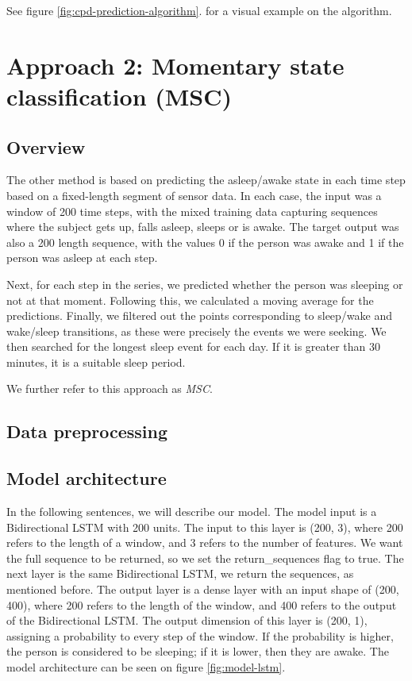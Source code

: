 \documentclass{article}
\begin{document}
See figure \ref{fig:cpd-prediction-algorithm}. for a visual example on the algorithm.

\section{Approach 2: Momentary state classification (MSC)}

\subsection{Overview}

The other method is based on predicting the asleep/awake state in each time step based on a fixed-length segment of sensor data. In each case, the input was a window of 200 time steps, with the mixed training data capturing sequences where the subject gets up, falls asleep, sleeps or is awake. The target output was also a 200 length sequence, with the values 0 if the person was awake and 1 if the person was asleep at each step.

Next, for each step in the series, we predicted whether the person was sleeping or not at that moment. Following this, we calculated a moving average for the predictions. Finally, we filtered out the points corresponding to sleep/wake and wake/sleep transitions, as these were precisely the events we were seeking. We then searched for the longest sleep event for each day. If it is greater than 30 minutes, it is a suitable sleep period.

We further refer to this approach as \textit{MSC}.

\subsection{Data preprocessing}

\subsection{Model architecture}
In the following sentences, we will describe our model. The model input is a Bidirectional LSTM with 200 units. The input to this layer is (200, 3), where 200 refers to the length of a window, and 3 refers to the number of features. We want the full sequence to be returned, so we set the return\_sequences flag to true. The next layer is the same Bidirectional LSTM, we return the sequences, as mentioned before. The output layer is a dense layer with an input shape of (200, 400), where 200 refers to the length of the window, and 400 refers to the output of the Bidirectional LSTM. The output dimension of this layer is (200, 1), assigning a probability to every step of the window. If the probability is higher, the person is considered to be sleeping; if it is lower, then they are awake. The model architecture can be seen on figure \ref{fig:model-lstm}.
\end{document}
